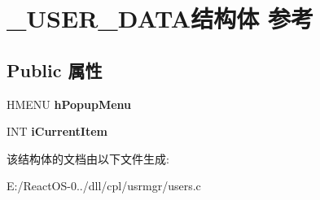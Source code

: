 \hypertarget{struct___u_s_e_r___d_a_t_a}{}\section{\+\_\+\+U\+S\+E\+R\+\_\+\+D\+A\+T\+A结构体 参考}
\label{struct___u_s_e_r___d_a_t_a}
\subsection*{Public 属性}
\begin{DoxyCompactItemize}
\item 
\mbox{\label{struct___u_s_e_r___d_a_t_a_a13a979a8556e939724c9fd44e7a2c950}} 
H\+M\+E\+NU {\bfseries h\+Popup\+Menu}
\item 
\mbox{\label{struct___u_s_e_r___d_a_t_a_ae0f936dd48f751665c175001f4a126ea}} 
I\+NT {\bfseries i\+Current\+Item}
\end{DoxyCompactItemize}


该结构体的文档由以下文件生成\+:\begin{DoxyCompactItemize}
\item 
E\+:/\+React\+O\+S-\/0../dll/cpl/usrmgr/users.\+c\end{DoxyCompactItemize}
